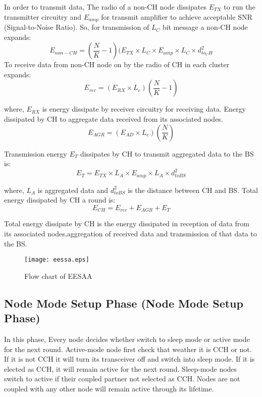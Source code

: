 \documentclass[journal]{IEEEtran}
\begin{document}
In order to transmit data, The radio of a non-CH node dissipates $E_{TX}$ to run the transmitter circuitry and $E_{amp}$ for transmit amplifier to achieve acceptable SNR (Signal-to-Noise Ratio). So, for transmission of $L_{C}$ bit message a non-CH node expands:
\begin{equation}\label{3}
   E_{non-CH}=\left(\frac{N}{K}-1 \right)(E_{TX}\times L_{C}\times E_{amp}\times L_{C}\times d^{2}_{to_CH}
\end{equation}
To receive data from non-CH node on by the radio of CH in each cluster expands:
\begin{equation}\label{3}
    E_{rec}= ({E}_{RX}\times {L}_{c})\left(\frac{N}{K}-1 \right)
\end{equation}

 where, ${E}_{RX}$ is energy dissipate by receiver circuitry for receiving data. Energy dissipated by CH to aggregate data received from its associated nodes.
\begin{equation}\label{5}
    E_{AGR}= ({E}_{AD} \times {L}_{c})\left(\frac{N}{K} \right)
\end{equation}


 Transmission energy $E_{T}$ dissipates by CH to transmit aggregated data to the BS is:
\begin{equation}\label{6}
    E_{T}=E_{TX} \times L_{A} \times E_{amp} \times L_{A} \times d^{2}_{to BS}
\end{equation}

 where, $L_{A}$ is aggregated data and $d^{2}_{to BS}$ is the distance between CH and BS. Total energy dissipated by CH  a round is:
\begin{equation}\label{7}
    E_{CH}=E_{rec}+E_{AGR}+E_{T}
\end{equation}

 Total energy dissipate by CH is the energy dissipated in reception of data from its associated nodes,aggregation of received data and transmission of that data to the BS.

 \begin{figure*}[t]
\begin{center}
\texttt{[image: eessa.eps]}
\caption{Flow chart of EESAA}\label{Figure 33}
\end{center}
\end{figure*}

 \subsection{Node Mode Setup Phase (Node Mode Setup Phase)}
 In this phase, Every node decides whether switch to sleep mode or active mode for the next round. Active-mode node first check that weather it is CCH or not. If it is not CCH it will turn its transceiver off and switch into sleep mode. If it is elected as CCH, it will remain active for the next round. Sleep-mode nodes switch to active if their coupled partner not selected as CCH. Nodes are not coupled with any other node will remain active through its lifetime.
\end{document}
